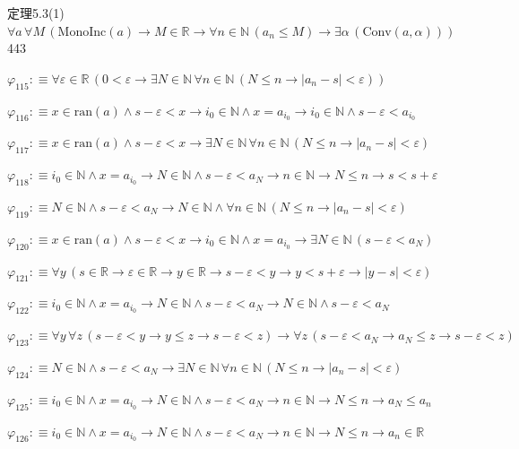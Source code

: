 \begin{fullproof}{定理5.3(1)}{$\forall a\,\forall M\,(\mathrm{MonoInc}(a) \to M \in \mathbb{R} \to \forall n \in \mathbb{N}\,(a_{n} \leq M) \to \exists \alpha\,(\mathrm{Conv}(a,\alpha)))$}{443}
\begin{abbrevlist}
\item $\varphi_{115} :\equiv \forall \varepsilon \in \mathbb{R}\,(0 < \varepsilon \to \exists N \in \mathbb{N}\,\forall n \in \mathbb{N}\,(N \leq n \to \lvert a_{n} - s \rvert < \varepsilon))$
\item $\varphi_{116} :\equiv x \in \mathrm{ran}(a) \land s - \varepsilon < x \to i_{0} \in \mathbb{N} \land x = a_{i_{0}} \to i_{0} \in \mathbb{N} \land s - \varepsilon < a_{i_{0}}$
\item $\varphi_{117} :\equiv x \in \mathrm{ran}(a) \land s - \varepsilon < x \to \exists N \in \mathbb{N}\,\forall n \in \mathbb{N}\,(N \leq n \to \lvert a_{n} - s \rvert < \varepsilon)$
\item $\varphi_{118} :\equiv i_{0} \in \mathbb{N} \land x = a_{i_{0}} \to N \in \mathbb{N} \land s - \varepsilon < a_{N} \to n \in \mathbb{N} \to N \leq n \to s < s + \varepsilon$
\item $\varphi_{119} :\equiv N \in \mathbb{N} \land s - \varepsilon < a_{N} \to N \in \mathbb{N} \land \forall n \in \mathbb{N}\,(N \leq n \to \lvert a_{n} - s \rvert < \varepsilon)$
\item $\varphi_{120} :\equiv x \in \mathrm{ran}(a) \land s - \varepsilon < x \to i_{0} \in \mathbb{N} \land x = a_{i_{0}} \to \exists N \in \mathbb{N}\,(s - \varepsilon < a_{N})$
\item $\varphi_{121} :\equiv \forall y\,(s \in \mathbb{R} \to \varepsilon \in \mathbb{R} \to y \in \mathbb{R} \to s - \varepsilon < y \to y < s + \varepsilon \to \lvert y - s \rvert < \varepsilon)$
\item $\varphi_{122} :\equiv i_{0} \in \mathbb{N} \land x = a_{i_{0}} \to N \in \mathbb{N} \land s - \varepsilon < a_{N} \to N \in \mathbb{N} \land s - \varepsilon < a_{N}$
\item $\varphi_{123} :\equiv \forall y\,\forall z\,(s - \varepsilon < y \to y \leq z \to s - \varepsilon < z) \to \forall z\,(s - \varepsilon < a_{N} \to a_{N} \leq z \to s - \varepsilon < z)$
\item $\varphi_{124} :\equiv N \in \mathbb{N} \land s - \varepsilon < a_{N} \to \exists N \in \mathbb{N}\,\forall n \in \mathbb{N}\,(N \leq n \to \lvert a_{n} - s \rvert < \varepsilon)$
\item $\varphi_{125} :\equiv i_{0} \in \mathbb{N} \land x = a_{i_{0}} \to N \in \mathbb{N} \land s - \varepsilon < a_{N} \to n \in \mathbb{N} \to N \leq n \to a_{N} \leq a_{n}$
\item $\varphi_{126} :\equiv i_{0} \in \mathbb{N} \land x = a_{i_{0}} \to N \in \mathbb{N} \land s - \varepsilon < a_{N} \to n \in \mathbb{N} \to N \leq n \to a_{n} \in \mathbb{R}$

\end{abbrevlist}
\end{fullproof}
